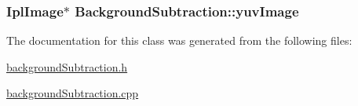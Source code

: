 \label{classBackgroundSubtraction_a7308617e19776a7695057e461e654448}
\hypertarget{classBackgroundSubtraction_abaa21c3ad9c48c1129407626f930f810}{
\subsubsection[{yuvImage}]{\setlength{\rightskip}{0pt plus 5cm}IplImage$\ast$ {\bf BackgroundSubtraction::yuvImage}}}
\label{classBackgroundSubtraction_abaa21c3ad9c48c1129407626f930f810}


The documentation for this class was generated from the following files:\begin{DoxyCompactItemize}
\item 
\hyperlink{backgroundSubtraction_8h}{backgroundSubtraction.h}\item 
\hyperlink{backgroundSubtraction_8cpp}{backgroundSubtraction.cpp}\end{DoxyCompactItemize}
